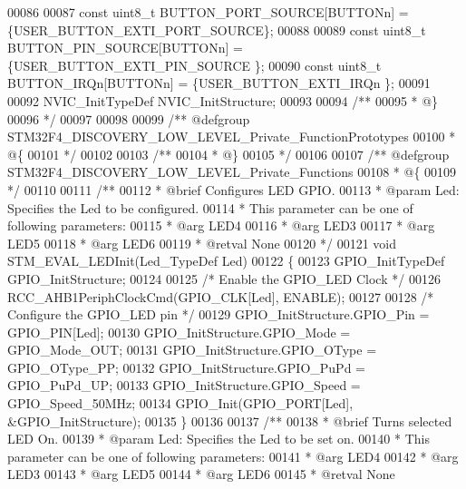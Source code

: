 \begin{DoxyCode}
00086 
00087 \textcolor{keyword}{const} uint8\_t BUTTON_PORT_SOURCE[BUTTONn] = \{USER_BUTTON_EXTI_PORT_SOURCE\};
00088 
00089 \textcolor{keyword}{const} uint8\_t BUTTON_PIN_SOURCE[BUTTONn] = \{USER_BUTTON_EXTI_PIN_SOURCE \};
00090 \textcolor{keyword}{const} uint8\_t BUTTON_IRQn[BUTTONn] = \{USER_BUTTON_EXTI_IRQn \};
00091 
00092 NVIC\_InitTypeDef   NVIC_InitStructure;
00093 
00094 \textcolor{comment}{/**}
00095 \textcolor{comment}{  * @\}}
00096 \textcolor{comment}{  */}
00097 
00098 
00099 \textcolor{comment}{/** @defgroup STM32F4\_DISCOVERY\_LOW\_LEVEL\_Private\_FunctionPrototypes}
00100 \textcolor{comment}{  * @\{}
00101 \textcolor{comment}{  */}
00102 
00103 \textcolor{comment}{/**}
00104 \textcolor{comment}{  * @\}}
00105 \textcolor{comment}{  */}
00106 
00107 \textcolor{comment}{/** @defgroup STM32F4\_DISCOVERY\_LOW\_LEVEL\_Private\_Functions}
00108 \textcolor{comment}{  * @\{}
00109 \textcolor{comment}{  */}
00110 
00111 \textcolor{comment}{/**}
00112 \textcolor{comment}{  * @brief  Configures LED GPIO.}
00113 \textcolor{comment}{  * @param  Led: Specifies the Led to be configured. }
00114 \textcolor{comment}{  *   This parameter can be one of following parameters:}
00115 \textcolor{comment}{  *     @arg LED4}
00116 \textcolor{comment}{  *     @arg LED3}
00117 \textcolor{comment}{  *     @arg LED5}
00118 \textcolor{comment}{  *     @arg LED6}
00119 \textcolor{comment}{  * @retval None}
00120 \textcolor{comment}{  */}
00121 \textcolor{keywordtype}{void} STM_EVAL_LEDInit(Led\_TypeDef Led)
00122 \{
00123   GPIO\_InitTypeDef  GPIO\_InitStructure;
00124 
00125   \textcolor{comment}{/* Enable the GPIO\_LED Clock */}
00126   RCC_AHB1PeriphClockCmd(GPIO_CLK[Led], ENABLE);
00127 
00128   \textcolor{comment}{/* Configure the GPIO\_LED pin */}
00129   GPIO\_InitStructure.GPIO_Pin = GPIO_PIN[Led];
00130   GPIO\_InitStructure.GPIO_Mode = GPIO_Mode_OUT;
00131   GPIO\_InitStructure.GPIO_OType = GPIO_OType_PP;
00132   GPIO\_InitStructure.GPIO_PuPd = GPIO_PuPd_UP;
00133   GPIO\_InitStructure.GPIO_Speed = GPIO_Speed_50MHz;
00134   GPIO_Init(GPIO_PORT[Led], &GPIO\_InitStructure);
00135 \}
00136 
00137 \textcolor{comment}{/**}
00138 \textcolor{comment}{  * @brief  Turns selected LED On.}
00139 \textcolor{comment}{  * @param  Led: Specifies the Led to be set on. }
00140 \textcolor{comment}{  *   This parameter can be one of following parameters:}
00141 \textcolor{comment}{  *     @arg LED4}
00142 \textcolor{comment}{  *     @arg LED3}
00143 \textcolor{comment}{  *     @arg LED5}
00144 \textcolor{comment}{  *     @arg LED6  }
00145 \textcolor{comment}{  * @retval None}

\end{DoxyCode}
